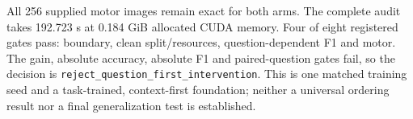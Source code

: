 \documentclass[10pt,a4paper]{article}
\begin{document}
All 256 supplied motor images remain exact for both arms. The complete audit
takes 192.723 s at 0.184 GiB allocated CUDA memory. Four of eight registered
gates pass: boundary, clean split/resources, question-dependent F1 and motor.
The gain, absolute accuracy, absolute F1 and paired-question gates fail, so
the decision is \texttt{reject\_question\_first\_intervention}. This is one
matched training seed and a task-trained, context-first foundation; neither a
universal ordering result nor a final generalization test is established.

\end{document}

